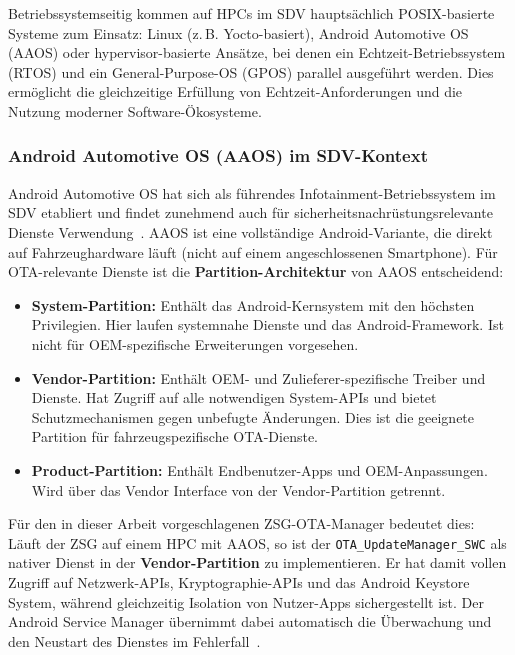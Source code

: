 ﻿\documentclass[12pt,a4paper,twoside]{article}
\begin{document}
Betriebssystemseitig kommen auf HPCs im SDV hauptsächlich POSIX-basierte
Systeme zum Einsatz: Linux (z.\,B. Yocto-basiert), Android Automotive OS (AAOS)
oder hypervisor-basierte Ansätze, bei denen ein Echtzeit-Betriebssystem (RTOS)
und ein General-Purpose-OS (GPOS) parallel ausgeführt werden. Dies ermöglicht
die gleichzeitige Erfüllung von Echtzeit-Anforderungen und die Nutzung moderner
Software-Ökosysteme.

\subsubsection{Android Automotive OS (AAOS) im SDV-Kontext}

Android Automotive OS hat sich als führendes Infotainment-Betriebssystem im SDV
etabliert und findet zunehmend auch für sicherheitsnachrüstungsrelevante Dienste
Verwendung~\cite{schneider2026ladekomm}. AAOS ist eine vollständige Android-Variante,
die direkt auf Fahrzeughardware läuft (nicht auf einem angeschlossenen Smartphone).
Für OTA-relevante Dienste ist die \textbf{Partition-Architektur} von AAOS entscheidend:

\begin{itemize}
  \item \textbf{System-Partition:} Enthält das Android-Kernsystem mit den höchsten
    Privilegien. Hier laufen systemnahe Dienste und das Android-Framework. Ist nicht
    für OEM-spezifische Erweiterungen vorgesehen.
  \item \textbf{Vendor-Partition:} Enthält OEM- und Zulieferer-spezifische Treiber
    und Dienste. Hat Zugriff auf alle notwendigen System-APIs und bietet
    Schutzmechanismen gegen unbefugte Änderungen. Dies ist die geeignete Partition
    für fahrzeugspezifische OTA-Dienste.
  \item \textbf{Product-Partition:} Enthält Endbenutzer-Apps und OEM-Anpassungen.
    Wird über das Vendor Interface von der Vendor-Partition getrennt.
\end{itemize}

Für den in dieser Arbeit vorgeschlagenen ZSG-OTA-Manager bedeutet dies: Läuft
der ZSG auf einem HPC mit AAOS, so ist der \texttt{OTA\_UpdateManager\_SWC}
als nativer Dienst in der \textbf{Vendor-Partition} zu implementieren. Er hat
damit vollen Zugriff auf Netzwerk-APIs, Kryptographie-APIs und das Android Keystore
System, während gleichzeitig Isolation von Nutzer-Apps sichergestellt ist.
Der Android Service Manager übernimmt dabei automatisch die Überwachung und
den Neustart des Dienstes im Fehlerfall~\cite{schneider2026ladekomm}.
\end{document}
